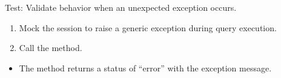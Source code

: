 \documentclass[letterpaper,10pt,english]{sphinxmanual}
\begin{document}
\begin{fulllineitems}
\label{\detokenize{test:test.test_room.test_list_rooms_unexpected_exception}}
\pysigstartsignatures
\pysiglinewithargsret
{}
{\sphinxparamcomma {}}
{}
\pysigstopsignatures
\sphinxAtStartPar
Test: Validate behavior when an unexpected exception occurs.
\begin{description}
\begin{enumerate}
%
\item {} 
\sphinxAtStartPar
Mock the session to raise a generic exception during query execution.

\item {} 
\sphinxAtStartPar
Call the  method.

\end{enumerate}

\begin{itemize}
\item {} 
\sphinxAtStartPar
The method returns a status of “error” with the exception message.

\end{itemize}

\end{description}

\end{fulllineitems}

\end{document}
